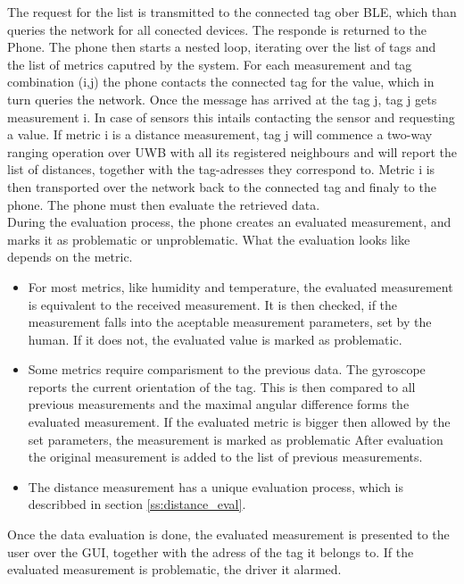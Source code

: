 The request for the list is transmitted to the connected tag ober BLE, which than queries the network for all conected devices.
The responde is returned to the Phone.
The phone then starts a nested loop, iterating over the list of tags and the list of metrics caputred by the system.
For each measurement and tag combination (i,j) the phone contacts the connected tag for the value, which in turn queries the network.
Once the message has arrived at the tag j, tag j gets measurement i. In case of sensors this intails contacting the sensor and requesting a value.
If metric i is a distance measurement, tag j will commence a two-way ranging operation over UWB with all its registered neighbours and will report the list of distances, together with the tag-adresses they correspond to.
Metric i is then transported over the network back to the connected tag and finaly to the phone.
The phone must then evaluate the retrieved data. \\
During the evaluation process, the phone creates an evaluated measurement, and marks it as problematic or unproblematic.
What the evaluation looks like depends on the metric.
\begin{itemize}
	\item For most metrics, like humidity and temperature, the evaluated measurement is equivalent to the received measurement. It is then checked, if the measurement falls into the aceptable measurement parameters, set by the human.
	If it does not, the evaluated value is marked as problematic.
	\item Some metrics require comparisment to the previous data. The gyroscope reports the current orientation of the tag.
	This is then compared to all previous measurements and the maximal angular difference forms the evaluated measurement.
	If the evaluated metric is bigger then allowed by the set parameters, the measurement is marked as problematic
	After evaluation the original measurement is added to the list of previous measurements.
	\item The distance measurement has a unique evaluation process, which is describbed in section \ref{ss:distance_eval}.
\end{itemize}
Once the data evaluation is done, the evaluated measurement is presented to the user over the GUI, together with the adress of the tag it belongs to.
If the evaluated measurement is problematic, the driver it alarmed.



